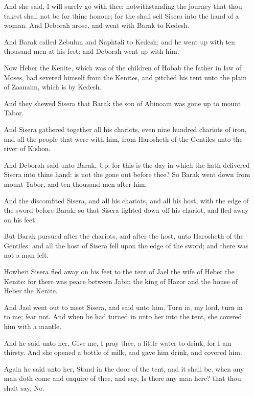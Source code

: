 \Verse And she said, I will surely go with thee: notwithstanding the journey that thou takest shall not be for thine honour; for the \LORD shall sell Sisera into the hand of a woman. And Deborah arose, and went with Barak to Kedesh.

\Verse And Barak called Zebulun and Naphtali to Kedesh; and he went up with ten thousand men at his feet: and Deborah went up with him.

\Verse Now Heber the Kenite, which was of the children of Hobab the father in law of Moses, had severed himself from the Kenites, and pitched his tent unto the plain of Zaanaim, which is by Kedesh.

\Verse And they shewed Sisera that Barak the son of Abinoam was gone up to mount Tabor.

\Verse And Sisera gathered together all his chariots, even nine hundred chariots of iron, and all the people that were with him, from Harosheth of the Gentiles unto the river of Kishon.

\Verse And Deborah said unto Barak, Up; for this is the day in which the \LORD hath delivered Sisera into thine hand: is not the \LORD gone out before thee? So Barak went down from mount Tabor, and ten thousand men after him.

\Verse And the \LORD discomfited Sisera, and all his chariots, and all his host, with the edge of the sword before Barak; so that Sisera lighted down off his chariot, and fled away on his feet.

\Verse But Barak pursued after the chariots, and after the host, unto Harosheth of the Gentiles: and all the host of Sisera fell upon the edge of the sword; and there was not a man left.

\Verse Howbeit Sisera fled away on his feet to the tent of Jael the wife of Heber the Kenite: for there was peace between Jabin the king of Hazor and the house of Heber the Kenite.

\Verse And Jael went out to meet Sisera, and said unto him, Turn in, my lord, turn in to me; fear not. And when he had turned in unto her into the tent, she covered him with a mantle.

\Verse And he said unto her, Give me, I pray thee, a little water to drink; for I am thirsty. And she opened a bottle of milk, and gave him drink, and covered him.

\Verse Again he said unto her, Stand in the door of the tent, and it shall be, when any man doth come and enquire of thee, and say, Is there any man here? that thou shalt say, No.

